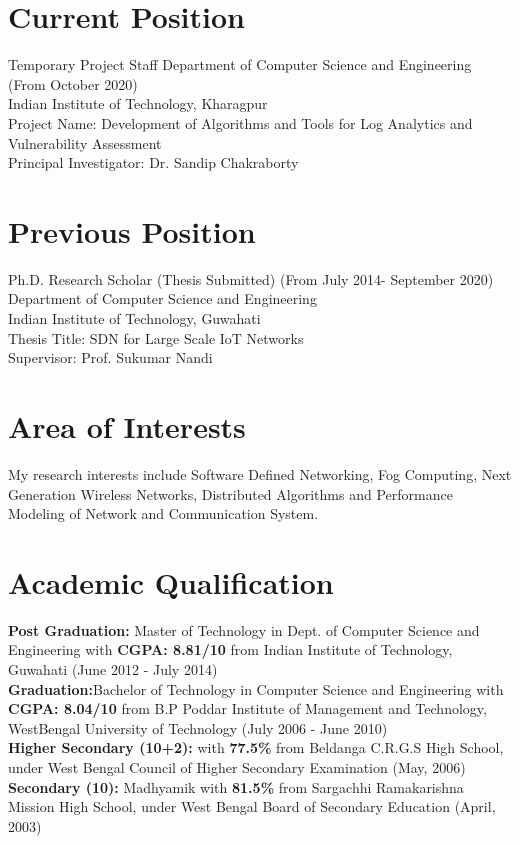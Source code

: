 \documentclass{article}
\begin{document}
\section{Current Position}          
Temporary 	Project Staff
Department of Computer Science and Engineering (From October 2020)\\
Indian Institute of Technology, Kharagpur\\
Project Name: Development of Algorithms and Tools for Log Analytics  and Vulnerability Assessment \\
Principal Investigator: Dr. Sandip Chakraborty
\section{Previous Position}
	Ph.D. Research Scholar (Thesis Submitted)  (From July 2014- September 2020)\\
    Department of Computer Science and Engineering\\
    Indian Institute of Technology, Guwahati\\
    Thesis Title: SDN for Large Scale IoT Networks\\
    Supervisor: Prof. Sukumar Nandi
\section{Area of Interests}    
 		My research interests include Software Defined Networking, Fog Computing, Next Generation Wireless Networks, Distributed Algorithms and Performance Modeling of Network and Communication System.
\section{Academic Qualification} 
	{\bf Post Graduation:} Master of Technology in Dept. of Computer Science and Engineering with {\bf CGPA: 8.81/10} from Indian Institute of Technology, Guwahati (June 2012 - July 2014)\\[3ex]
	{\bf Graduation:}Bachelor of Technology in Computer Science and Engineering with {\bf CGPA: 8.04/10} from B.P Poddar Institute of Management and Technology, WestBengal University of Technology (July 2006 - June 2010)\\[3ex]
	{\bf Higher Secondary (10+2):} with {\bf 77.5\%} from Beldanga C.R.G.S High School, under West Bengal Council of Higher Secondary Examination (May, 2006)\\[3ex]
	{\bf Secondary (10):} Madhyamik with {\bf 81.5\%} from Sargachhi Ramakarishna Mission High School, under West Bengal Board of Secondary Education (April, 2003)
\end{document}
